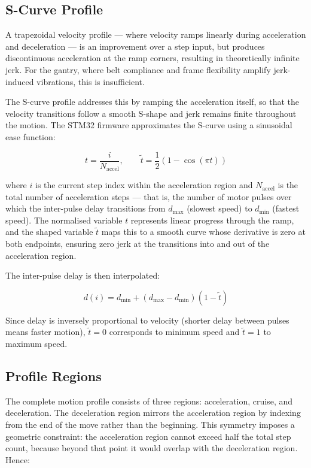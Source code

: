 \subsection{S-Curve Profile}

A trapezoidal velocity profile --- where velocity ramps linearly during acceleration and deceleration --- is an improvement over a step input, but produces discontinuous acceleration at the ramp corners, resulting in theoretically infinite jerk. For the gantry, where belt compliance and frame flexibility amplify jerk-induced vibrations, this is insufficient.

The S-curve profile addresses this by ramping the acceleration itself, so that the velocity transitions follow a smooth S-shape and jerk remains finite throughout the motion. The STM32 firmware approximates the S-curve using a sinusoidal ease function:

\begin{equation}
    t = \frac{i}{N_\text{accel}}, \qquad \tilde{t} = \frac{1}{2}\left(1 - \cos(\pi t)\right)
\end{equation}

where $i$ is the current step index within the acceleration region and $N_\text{accel}$ is the total number of acceleration steps --- that is, the number of motor pulses over which the inter-pulse delay transitions from $d_\text{max}$ (slowest speed) to $d_\text{min}$ (fastest speed). The normalised variable $t$ represents linear progress through the ramp, and the shaped variable $\tilde{t}$ maps this to a smooth curve whose derivative is zero at both endpoints, ensuring zero jerk at the transitions into and out of the acceleration region.

The inter-pulse delay is then interpolated:

\begin{equation}
    d(i) = d_\text{min} + (d_\text{max} - d_\text{min})(1 - \tilde{t})
\end{equation}

Since delay is inversely proportional to velocity (shorter delay between pulses means faster motion), $\tilde{t} = 0$ corresponds to minimum speed and $\tilde{t} = 1$ to maximum speed.

\subsection{Profile Regions}

The complete motion profile consists of three regions: acceleration, cruise, and deceleration. The deceleration region mirrors the acceleration region by indexing from the end of the move rather than the beginning. This symmetry imposes a geometric constraint: the acceleration region cannot exceed half the total step count, because beyond that point it would overlap with the deceleration region. Hence:

